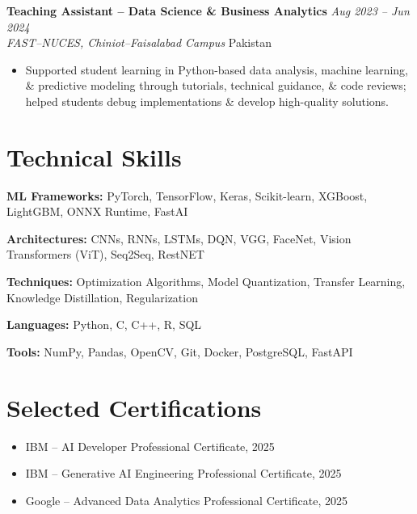 \documentclass[10.5pt,a4paper]{article}
\newcommand{\entry}[4]{%
    \noindent
    \noindent\textbf{#1} \hfill \textit{#2}\\
    \textit{#3} \hfill #4\\[-1pt]
}
\begin{document}
\entry
{Teaching Assistant -- Data Science \& Business Analytics}
{Aug 2023 -- Jun 2024}
{FAST--NUCES, Chiniot--Faisalabad Campus}
{Pakistan}

\begin{itemize}
\item Supported student learning in Python-based data analysis, machine learning, \& predictive modeling through tutorials, technical guidance, \& code reviews; helped students debug implementations \& develop high-quality solutions.
\end{itemize}


\section*{Technical Skills}

\noindent\textbf{ML Frameworks:}
PyTorch, TensorFlow, Keras, Scikit-learn, XGBoost, LightGBM, ONNX Runtime, FastAI

\noindent\textbf{Architectures:}
CNNs, RNNs, LSTMs, DQN, VGG, FaceNet, Vision Transformers (ViT), Seq2Seq, RestNET

\noindent\textbf{Techniques:}
Optimization Algorithms, Model Quantization, Transfer Learning, Knowledge Distillation,
Regularization

\noindent\textbf{Languages:}
Python, C, C++, R, SQL

\noindent\textbf{Tools:}
NumPy, Pandas, OpenCV, Git, Docker, PostgreSQL, FastAPI


\section*{Selected Certifications}

\begin{itemize}
    \item IBM -- AI Developer Professional Certificate, 2025
    \item IBM -- Generative AI Engineering Professional Certificate, 2025
    \item Google -- Advanced Data Analytics Professional Certificate, 2025
\end{itemize}


\end{document}
